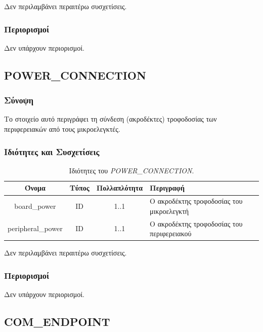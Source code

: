 \noindent Δεν περιλαμβάνει περαιτέρω συσχετίσεις.

\subsubsection*{Περιορισμοί}

\noindent Δεν υπάρχουν περιορισμοί.

\subsection{POWER\_CONNECTION}
\label{subsec:power_connection}

\subsubsection*{Σύνοψη}

\noindent Το στοιχείο αυτό περιγράφει τη σύνδεση (ακροδέκτες) τροφοδοσίας των περιφερειακών από τους μικροελεγκτές.

\subsubsection*{Ιδιότητες και Συσχετίσεις}

\begin{table}[H]
	\begin{center}
		\caption{Ιδιότητες του \textit{POWER\_CONNECTION}.}
		\label{tab:power_connection}
		\begin{tabular}{ | c | c | c| m{5.5cm} | }
			\hline
			\rowcolor{Gray}
			Όνομα & Τύπος & Πολλαπλότητα & Περιγραφή \\
			\hline
			board\_power & ID & 1..1 & Ο ακροδέκτης τροφοδοσίας του μικροελεγκτή \\
			\hline
			peripheral\_power & ID & 1..1 & Ο ακροδέκτης τροφοδοσίας του περιφερειακού \\
			\hline
		\end{tabular}
	\end{center}
\end{table}

\noindent Δεν περιλαμβάνει περαιτέρω συσχετίσεις.

\subsubsection*{Περιορισμοί}

\noindent Δεν υπάρχουν περιορισμοί.

\subsection{COM\_ENDPOINT}
\label{subsec:com_endpoint}

